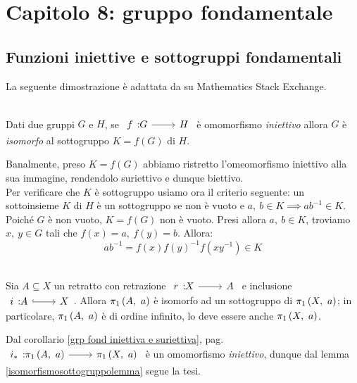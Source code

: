 \section{Capitolo 8: gruppo fondamentale}
\subsection{Funzioni iniettive e sottogruppi fondamentali}
La seguente dimostrazione è adattata da \cite{HagenVonEitzen:injectivesubgroup} su Mathematics Stack Exchange.
\begin{lemming}~{}\label{isomorfismosottogruppolemma}\\
Dati due gruppi $G$ e $H$, se $\funz{f}{G}{H}$ è omomorfismo \textit{iniettivo} allora $G$ è \textit{isomorfo} al sottogruppo $K=f\left(G\right)$ di $H$.
\end{lemming}
\begin{demonstration}
	Banalmente, preso $K=f\left(G\right)$ abbiamo ristretto l'omeomorfismo iniettivo alla sua immagine, rendendolo suriettivo e dunque biettivo.\\
	Per verificare che $K$ è sottogruppo usiamo ora il criterio seguente: un sottoinsieme $K$ di $H$ è un sottogruppo se non è vuoto e $a,\ b\in K\implies ab^{-1}\in K$. Poiché $G$ è non vuoto, $K=f\left(G\right)$ non è vuoto. Presi allora $a,\ b\in K$, troviamo $x,\ y\in G$ tali che $f\left(x\right)=a,\ f\left(y\right)=b$. Allora:
	\begin{equation*}
		ab^{-1}=f\left(x\right)f\left(y\right)^{-1}f\left(xy^{-1}\right)\in K
	\end{equation*}
\vspace{-6mm}
\end{demonstration}
\begin{corollary}~{}\\
	Sia $A\subseteq X$ un retratto con retrazione $\funz{r}{X}{A}$ e inclusione $\incl{i}{A}{X}$. Allora $\gruf{A}{a}$ è isomorfo ad un sottogruppo di $\gruf{X}{a}$; in particolare, $\gruf{A}{a}$ è di ordine infinito, lo deve essere anche $\gruf{X}{a}$.
\end{corollary}
\begin{demonstration}
	Dal corollario \ref{grp fond iniettiva e suriettiva}, pag. \pageref{grp fond iniettiva e suriettiva} $\funz{i_{\ast}}{\gruf{A}{a}}{\gruf{X}{a}}$ è un omomorfismo \textit{iniettivo}, dunque dal lemma \ref{isomorfismosottogruppolemma} segue la tesi.
\end{demonstration}
